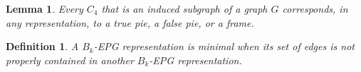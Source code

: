 \documentclass[9pt]{entcs}
\newtheorem{lema}{Lemma}[section]
\newtheorem{defi}{Definition}[section]
\newtheorem{prove}{Proof}[section]
\begin{document}
%


\begin{lema}\label{lem:representacaoC4}
\cite{golumbic2009} Every  $C_4$ that is an induced subgraph of a graph $ G $ corresponds, in any representation, to a true pie, a false pie, or a frame.
\end{lema}




\begin{defi}
A $B_k$-EPG representation is \emph{minimal} 
when its set of edges  is not properly contained in another $B_k$-EPG representation. 
\end{defi}
\end{document}
